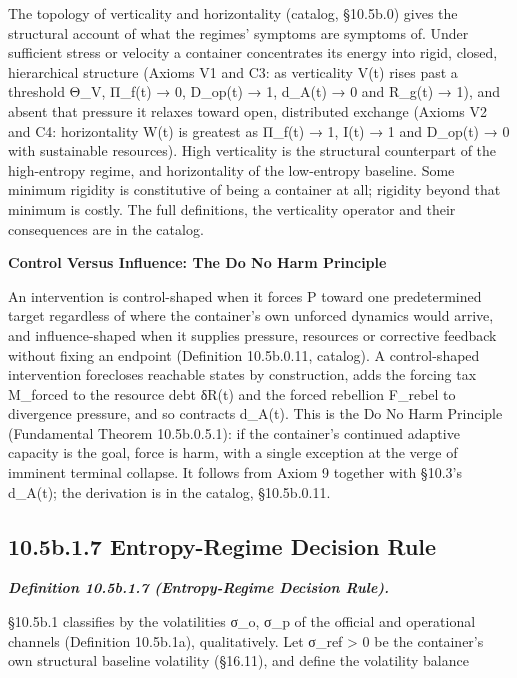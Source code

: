 \documentclass[
]{article}
\begin{document}
The topology of verticality and horizontality (catalog, §10.5b.0) gives
the structural account of what the regimes' symptoms are symptoms of.
Under sufficient stress or velocity a container concentrates its energy
into rigid, closed, hierarchical structure (Axioms V1 and C3: as
verticality V(t) rises past a threshold Θ\_V, Π\_f(t) → 0, D\_op(t) → 1,
d\_A(t) → 0 and R\_g(t) → 1), and absent that pressure it relaxes toward
open, distributed exchange (Axioms V2 and C4: horizontality W(t) is
greatest as Π\_f(t) → 1, I(t) → 1 and D\_op(t) → 0 with sustainable
resources). High verticality is the structural counterpart of the
high-entropy regime, and horizontality of the low-entropy baseline. Some
minimum rigidity is constitutive of being a container at all; rigidity
beyond that minimum is costly. The full definitions, the verticality
operator and their consequences are in the catalog.

\textbf{Control Versus Influence: The Do No Harm Principle}

An intervention is control-shaped when it forces P toward one
predetermined target regardless of where the container's own unforced
dynamics would arrive, and influence-shaped when it supplies pressure,
resources or corrective feedback without fixing an endpoint (Definition
10.5b.0.11, catalog). A control-shaped intervention forecloses reachable
states by construction, adds the forcing tax M\_forced to the resource
debt δR(t) and the forced rebellion F\_rebel to divergence pressure, and
so contracts d\_A(t). This is the Do No Harm Principle (Fundamental
Theorem 10.5b.0.5.1): if the container's continued adaptive capacity is
the goal, force is harm, with a single exception at the verge of
imminent terminal collapse. It follows from Axiom 9 together with
§10.3's d\_A(t); the derivation is in the catalog, §10.5b.0.11.

\hypertarget{b.1.7-entropy-regime-decision-rule}{%
\subsection{10.5b.1.7 Entropy-Regime Decision
Rule}\label{b.1.7-entropy-regime-decision-rule}}

\emph{\textbf{Definition 10.5b.1.7 (Entropy-Regime Decision Rule).}}

§10.5b.1 classifies by the volatilities σ\_o, σ\_p of the official and
operational channels (Definition 10.5b.1a), qualitatively. Let σ\_ref
\textgreater{} 0 be the container's own structural baseline volatility
(§16.11), and define the volatility balance
\end{document}
